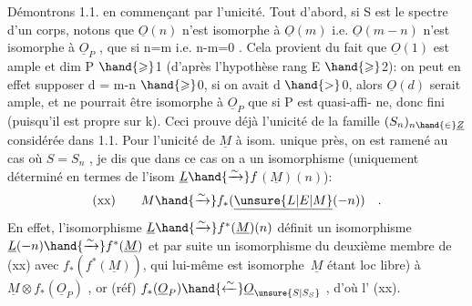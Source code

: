 Démontrons  1.1.  en commençant par l'unicité.  Tout d'abord, si S est
le spectre d'un corps, notons que  $\underline{O}(n)$ n'est isomorphe à $\underline{O}(m)$ i.e.
$\underline{O}(m-n)$  n'est  isomorphe à $\underline{O}_P$ , que si  n=m i.e.  n-m=0 .  Cela provient
du fait que $\underline{O}(1)$ est ample et  dim P $\hand{\geqslant}$1 (d'après l'hypothèse rang E $\hand{\geqslant}$2):
on peut en effet supposer  d = m-n $\hand{\geqslant}$0, si on avait d $\hand{>}$0, alors $\underline{O}(d)$
serait ample, et ne pourrait être isomorphe à  $\underline{O}_P$ que si P est quasi-affi-%
ne, donc fini (puisqu'il est propre sur k).  Ceci prouve déjà  l'unicité
de la famille $(S_n)_{n\hand{\in}\underline{Z}}$  considérée dans 1.1.  Pour l'unicité de $\underline{M}$ à isom.
unique près, on est ramené au cas où  $S=S_n$ , je dis que dans ce cas on a
un isomorphisme  (uniquement déterminé en termes de l'isom  $\underline{L} \hand{\xrightarrow{\sim}} f$\over{$_*$}{$^*$}$(\underline{M})(n)$):
\[ \text{(xx)} \qquad M \hand{\xrightarrow{\sim}} f_*(\underline{\unsure{L|E|M}}(-n)) \quad . \]
En effet,  l'isomorphisme  $\underline{L} \hand{\xrightarrow{\sim}} f^*(\underline{M})(n)$   définit un isomorphisme
$\underline{L}(-n) \hand{\xrightarrow{\sim}} f^*(\underline{M})$  et par suite un isomorphisme du deuxième membre de (xx)
avec $f_*(f^*(\underline{M}))$, qui lui-même est isomorphe \,$\underline{M}$ étant loc libre) à
$\underline{M}\otimes f_*(\underline{O}_P)$ , or  (réf)  $f_*(\underline{O}_P) \hand{\xleftarrow{\sim}} \underline{O}_{\unsure{S|S_S}}$ ,  d'où l' (xx).\margin{\ensuremath{\backslash}}

